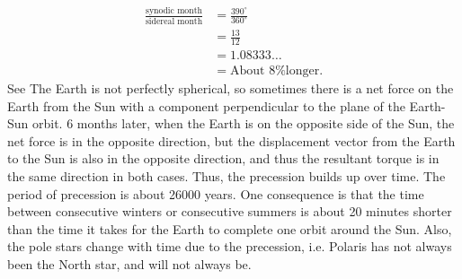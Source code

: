 \documentclass{templates/homework}
\begin{document}
\begin{align*}
    \frac{\text{synodic month}}{\text{sidereal month}}
    &= \frac{390^\circ}{360^\circ} \\
    &= \frac{13}{12} \\
    &= 1.08333\dots \\
    &= \text{About 8\% longer}.
\end{align*}
See 
\exercise
The Earth is not perfectly spherical, so sometimes
there is a net force on the Earth from the Sun with a component
perpendicular to the plane of the Earth-Sun orbit. 6 months later,
when the Earth is on the opposite side of the Sun, the net force is in the opposite direction,
but the displacement vector from the Earth to the Sun is also in the opposite direction,
and thus the resultant torque is in the same direction in both cases. Thus, the
precession builds up over time. The period of precession is about 26000 years.
One consequence is that the time between consecutive winters
or consecutive summers is about 20 minutes shorter than the time it takes
for the Earth to complete one orbit around the Sun. Also, the pole stars change
with time due to the precession, i.e. Polaris has not always been the North star,
and will not always be.
\end{document}
